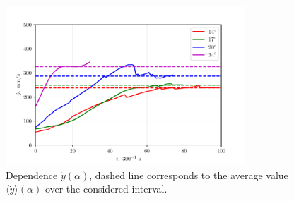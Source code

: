 \begin{figure}[htbp]
	\centering
	\includegraphics[width=0.8\textwidth]{figures/6)_vs_lines.pdf}
	\caption{Dependence $\dot{y} (\alpha)$, dashed line corresponds to the average value $\langle \dot{y}\rangle (\alpha)$ over the considered interval.}
	\label{fig:label}
\end{figure}